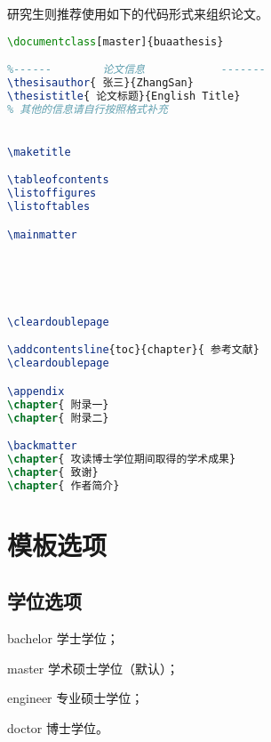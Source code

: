 \qquad 研究生则推荐使用如下的代码形式来组织论文。\par
\begin{lstlisting}[language={LaTeX}]
\documentclass[master]{buaathesis}

%------        论文信息            -------
\thesisauthor{ 张三}{ZhangSan}
\thesistitle{ 论文标题}{English Title}
% 其他的信息请自行按照格式补充


\maketitle

\tableofcontents
\listoffigures
\listoftables

\mainmatter





\cleardoublepage

\addcontentsline{toc}{chapter}{ 参考文献}
\cleardoublepage

\appendix
\chapter{ 附录一}
\chapter{ 附录二}

\backmatter
\chapter{ 攻读博士学位期间取得的学术成果}
\chapter{ 致谢}
\chapter{ 作者简介}


\end{lstlisting}
    
    \section{模板选项}
        \subsection{学位选项}
        \begin{description}
            \item{bachelor} 学士学位；
            \item{master} 学术硕士学位（默认）；
            \item{engineer} 专业硕士学位；
            \item{doctor} 博士学位。
        \end{description}


